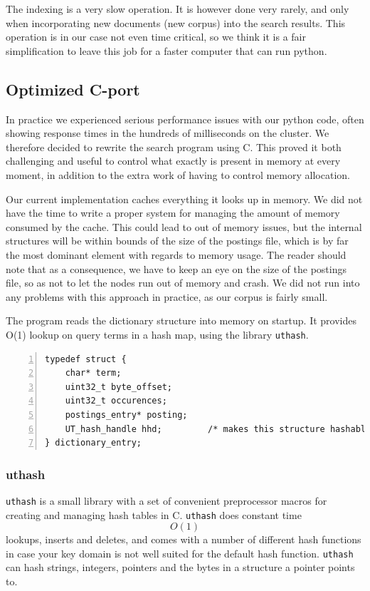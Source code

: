 The indexing is a very slow operation. It is however done very rarely, and only when incorporating new documents (new corpus) into the search results. This operation is in our case not even time critical, so we think it is a fair simplification to leave this job for a faster computer that can run python.

\subsection{Optimized C-port}
In practice we experienced serious performance issues with our python code, often showing response times in the hundreds of milliseconds on the cluster. We therefore decided to rewrite the search program using C. This proved it both challenging and useful to control what exactly is present in memory at every moment, in addition to the extra work of having to control memory allocation.

Our current implementation caches everything it looks up in memory. We did not have the time to write a proper system for managing the amount of memory consumed by the cache.
This could lead to out of memory issues, but the internal structures will be within bounds of the size of the postings file, which is by far the most dominant element with regards to memory usage.
The reader should note that as a consequence, we have to keep an eye on the size of the postings file, so as not to let the nodes run out of memory and crash. We did not run into any problems with this approach in practice, as our corpus is fairly small.

The program reads the dictionary structure into memory on startup. It provides O(1) lookup on query terms in a hash map, using the library {\tt uthash}\cite{uthash}.

\begin{lstlisting}[style=customc,captionpos=b,caption={Structure of a dictionary entry (term)},numbers=left]
typedef struct {
    char* term;
    uint32_t byte_offset;
    uint32_t occurences;
    postings_entry* posting;
    UT_hash_handle hhd;         /* makes this structure hashable */
} dictionary_entry;
\end{lstlisting}
\subsubsection{uthash}
{\tt uthash} is a small library with a set of convenient preprocessor macros for creating and managing hash tables in C.
{\tt uthash} does constant time $$O(1)$$ lookups, inserts and deletes, and comes with a number of different hash functions in case your key domain is not well suited for the default hash function.
{\tt uthash} can hash strings, integers, pointers and the bytes in a structure a pointer points to.

